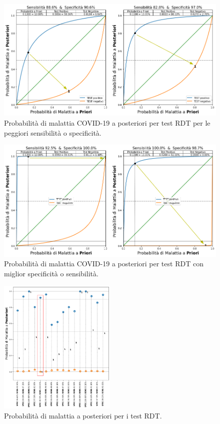 \documentclass[11pt]{article}
\begin{document}
        \begin{figure}
        \centering
            \includegraphics{covidrdtpeggio.png}
            \caption{Probabilità di malattia COVID-19 a posteriori per test RDT per le peggiori sensibilità o specificità.}
            \label{fig:covidrdtpeggio}
        \end{figure}

    
    
        \begin{figure}
        \centering
            \includegraphics{covidrdtmeglio.png}
            \caption{Probabilità di malattia COVID-19 a posteriori per test RDT con miglior specificità o sensibilità.}
            \label{fig:covidrdtmeglio}
        \end{figure}

    
    
        \begin{figure}
        \centering
            \includegraphics[width=0.5\textwidth,height=0.5\textheight,keepaspectratio]{allrdt.png}
            \caption{Probabilità di malattia a posteriori per i test RDT.}
            \label{fig:allrdt}
        \end{figure}
\end{document}
